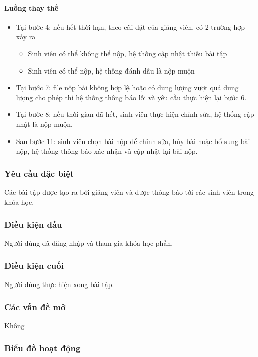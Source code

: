 \documentclass[./../main_file.tex]{subfiles}
\begin{document}
\paragraph{Luồng thay thế}
\begin{itemize}
	\item Tại bước 4: nếu hết thời hạn, theo cài đặt của giảng viên, có 2 trường hợp xảy ra
	\begin{itemize}
		\item Sinh viên có thể không thể nộp, hệ thống cập nhật thiếu bài tập
		\item Sinh viên có thể nộp, hệ thống đánh dấu là nộp muộn
	\end{itemize}
	
	\item Tại bước 7: file nộp bài không hợp lệ hoặc có dung lượng vượt quá dung lượng cho phép thì hệ thống thông báo lỗi và yêu cầu thực hiện lại bước 6.
	\item Tại bước 8: nếu thời gian đã hết, sinh viên thực hiện chỉnh sửa, hệ thống cập nhật là nộp muộn.
	\item Sau bước 11: sinh viên chọn bài nộp để chỉnh sửa, hủy bài hoặc bổ sung bài nộp, hệ thống thông báo xác nhận và cập nhật lại bài nộp.
	
\end{itemize}
\subsubsection{Yêu cầu đặc biệt}
Các bài tập được tạo ra bởi giảng viên và được thông báo tới các sinh viên trong khóa học.

\subsubsection{Điều kiện đầu}
Người dùng đã đăng nhập và tham gia khóa học phần.

\subsubsection{Điều kiện cuối}
Người dùng thực hiện xong bài tập.

\subsubsection{Các vấn đề mở}
Không

\subsubsection{Biểu đồ hoạt động}
\end{document}
